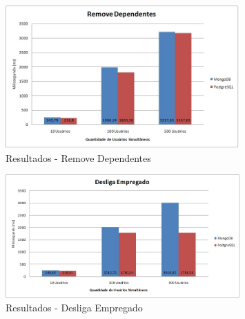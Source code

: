 \begin{figure}[!htbp]
	\begin{center}
		\includegraphics[width=0.8\textwidth]{resultados/remove_dependentes}
	\end{center}
	\caption{Resultados - Remove Dependentes}
	\label{fig:resultremovedependentes}
\end{figure}

\begin{figure}[!htbp]
	\begin{center}
		\includegraphics[width=0.8\textwidth]{resultados/desliga_empregado}
	\end{center}
	\caption{Resultados - Desliga Empregado}
	\label{fig:resultdesliga_empregado}
\end{figure}


